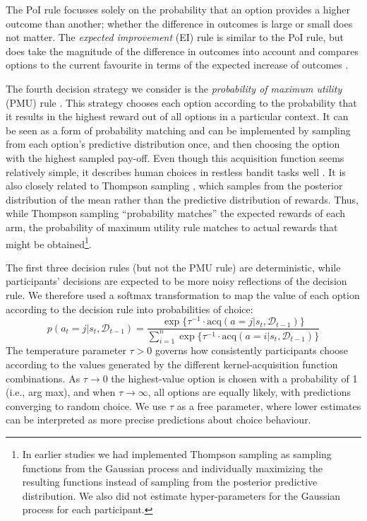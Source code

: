 \documentclass[a4paper,natbib]{apa6}
\begin{document}
The PoI rule focusses solely on the probability that an option provides a higher outcome than another; whether the difference in outcomes is large or small does not matter. The \emph{expected improvement} (EI) rule is similar to the PoI rule, but does take the magnitude of the difference in outcomes into account and compares options to the current favourite in terms of the expected increase of outcomes \citep{mockus1978application}. 

The fourth decision strategy we consider is the \emph{probability of maximum utility} (PMU) rule \citep{speekenbrinkuncertainty}. This strategy chooses each option according to the probability that it results in the highest reward out of all options in a particular context. It can be seen as a form of probability matching \citep{neimark1959comparison} and can be implemented by sampling from each option's predictive distribution once, and then choosing the option with the highest sampled pay-off. Even though this acquisition function seems relatively simple, it describes human choices in restless bandit tasks well \citep{speekenbrinkuncertainty}. It is also closely related to Thompson sampling \citep{may2012optimistic}, which samples from the posterior distribution of the mean rather than the predictive distribution of rewards. Thus, while Thompson sampling ``probability matches'' the expected rewards of each arm, the probability of maximum utility rule matches to actual rewards that might be obtained\footnote{In earlier studies \citep{schulz2015exploration} we had implemented Thompson sampling as sampling functions from the Gaussian process and individually maximizing the resulting functions instead of sampling from the posterior predictive distribution. We also did not estimate hyper-parameters for the Gaussian process for each participant.}. 

The first three decision rules (but not the PMU rule) are deterministic, while participants' decisions are expected to be more noisy reflections of the decision rule. We therefore used a softmax transformation to map the value of each option according to the decision rule into probabilities of choice: 
\begin{equation}
\label{tradeoff}
p(a_t=j|s_t, \mathcal{D}_{t-1})=\frac{\exp\{\tau^{-1} \cdot \text{acq}(a = j|s_t,\mathcal{D}_{t-1})\}}{\sum_{i=1}^{n}\exp\{ \tau^{-1} \cdot \text{acq}(a = i|s_t,\mathcal{D}_{t-1}) \}}
\end{equation}
The temperature parameter $\tau>0$ governs how consistently participants choose according to the values generated by the different kernel-acquisition function combinations. As $\tau\rightarrow 0$ the highest-value option is chosen with a probability of 1 (i.e., arg max), and when $\tau\rightarrow \infty$, all options are equally likely, with predictions converging to random choice. We use $\tau$ as a free parameter, where lower estimates can be interpreted as more precise predictions about choice behaviour.
\end{document}
